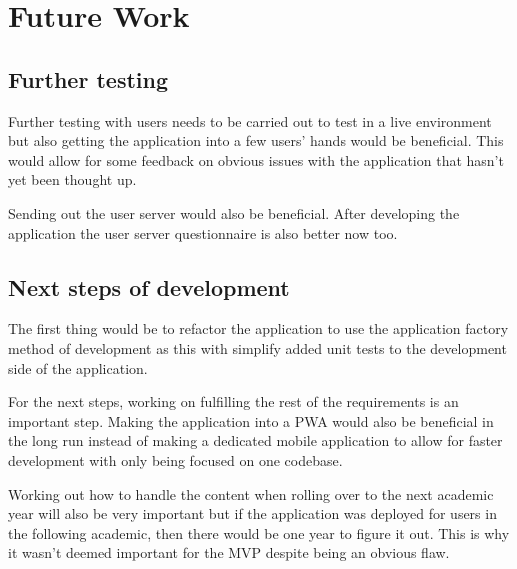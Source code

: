 \chapter{Future Work}

\section{Further testing}

Further testing with users needs to be carried out to test in a live environment but also getting the application into a few users' hands would be beneficial.  This would allow for some feedback on obvious issues with the application that hasn't yet been thought up.

Sending out the user server would also be beneficial. After developing the application the user server questionnaire is also better now too. 

\section{Next steps of development}

The first thing would be to refactor the application to use the application factory method of development as this with simplify added unit tests to the development side of the application. 

For the next steps, working on fulfilling the rest of the requirements is an important step. Making the application into a PWA would also be beneficial in the long run instead of making a dedicated mobile application to allow for faster development with only being focused on one codebase.

Working out how to handle the content when rolling over to the next academic year will also be very important but if the application was deployed for users in the following academic, then there would be one year to figure it out. This is why it wasn't deemed important for the MVP despite being an obvious flaw.
